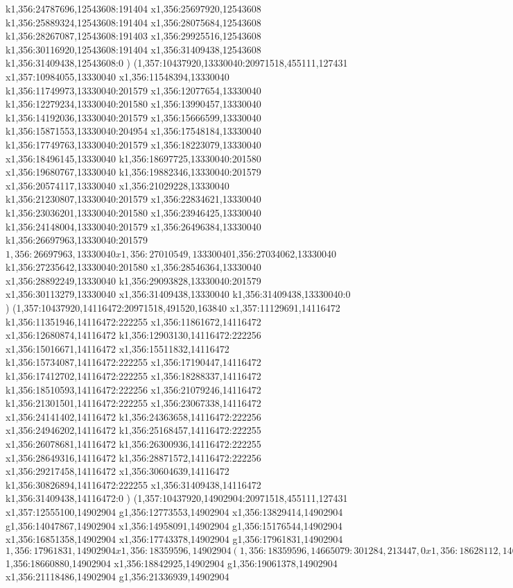 {k1,356:24787696,12543608:191404
x1,356:25697920,12543608
k1,356:25889324,12543608:191404
x1,356:28075684,12543608
k1,356:28267087,12543608:191403
x1,356:29925516,12543608
k1,356:30116920,12543608:191404
x1,356:31409438,12543608
k1,356:31409438,12543608:0
)
(1,357:10437920,13330040:20971518,455111,127431
x1,357:10984055,13330040
x1,356:11548394,13330040
k1,356:11749973,13330040:201579
x1,356:12077654,13330040
k1,356:12279234,13330040:201580
x1,356:13990457,13330040
k1,356:14192036,13330040:201579
x1,356:15666599,13330040
k1,356:15871553,13330040:204954
x1,356:17548184,13330040
k1,356:17749763,13330040:201579
x1,356:18223079,13330040
x1,356:18496145,13330040
k1,356:18697725,13330040:201580
x1,356:19680767,13330040
k1,356:19882346,13330040:201579
x1,356:20574117,13330040
x1,356:21029228,13330040
k1,356:21230807,13330040:201579
x1,356:22834621,13330040
k1,356:23036201,13330040:201580
x1,356:23946425,13330040
k1,356:24148004,13330040:201579
x1,356:26496384,13330040
k1,356:26697963,13330040:201579
$1,356:26697963,13330040
x1,356:27010549,13330040
$1,356:27034062,13330040
k1,356:27235642,13330040:201580
x1,356:28546364,13330040
x1,356:28892249,13330040
k1,356:29093828,13330040:201579
x1,356:30113279,13330040
x1,356:31409438,13330040
k1,356:31409438,13330040:0
)
(1,357:10437920,14116472:20971518,491520,163840
x1,357:11129691,14116472
k1,356:11351946,14116472:222255
x1,356:11861672,14116472
x1,356:12680874,14116472
k1,356:12903130,14116472:222256
x1,356:15016671,14116472
x1,356:15511832,14116472
k1,356:15734087,14116472:222255
x1,356:17190447,14116472
k1,356:17412702,14116472:222255
x1,356:18288337,14116472
k1,356:18510593,14116472:222256
x1,356:21079246,14116472
k1,356:21301501,14116472:222255
x1,356:23067338,14116472
x1,356:24141402,14116472
k1,356:24363658,14116472:222256
x1,356:24946202,14116472
k1,356:25168457,14116472:222255
x1,356:26078681,14116472
k1,356:26300936,14116472:222255
x1,356:28649316,14116472
k1,356:28871572,14116472:222256
x1,356:29217458,14116472
x1,356:30604639,14116472
k1,356:30826894,14116472:222255
x1,356:31409438,14116472
k1,356:31409438,14116472:0
)
(1,357:10437920,14902904:20971518,455111,127431
x1,357:12555100,14902904
g1,356:12773553,14902904
x1,356:13829414,14902904
g1,356:14047867,14902904
x1,356:14958091,14902904
g1,356:15176544,14902904
x1,356:16851358,14902904
x1,356:17743378,14902904
g1,356:17961831,14902904
$1,356:17961831,14902904
x1,356:18359596,14902904
(1,356:18359596,14665079:301284,213447,0
x1,356:18628112,14665079
)
$1,356:18660880,14902904
x1,356:18842925,14902904
g1,356:19061378,14902904
x1,356:21118486,14902904
g1,356:21336939,14902904
}
